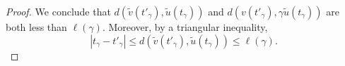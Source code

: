 \documentclass[a4paper,english,reqno]{amsart}
\newtheorem{lemma}{Lemma}
\theoremstyle{definition}
\numberwithin{equation}{section}
\begin{document}
\begin{proof}
 	We conclude that $d(\tilde v(t'_\gamma),\tilde{u}(t_\gamma) )$ and $d(v(t'_\gamma), \gamma \tilde{u}(t_\gamma) )$ are both less than $\ell(\gamma)$. Moreover, by a triangular inequality,
 	\[
 	|t_\gamma - t'_\gamma | \le d(\tilde v(t'_\gamma),\tilde{u}(t_\gamma) ) \le \ell(\gamma).
 	\]
 	
% 	
% 	
% 	
 	

\end{proof}
\end{document}
